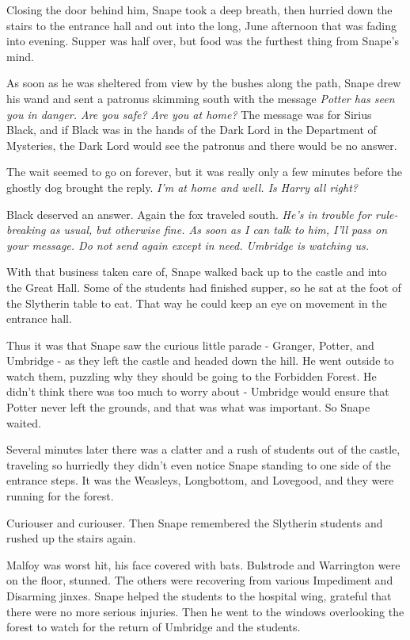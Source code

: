 \documentclass[a4paper,11pt]{article}
\begin{document}
Closing the door behind him, Snape took a deep breath, then hurried down the stairs to the entrance hall and out into the long, June afternoon that was fading into evening. Supper was half over, but food was the furthest thing from Snape's mind.

As soon as he was sheltered from view by the bushes along the path, Snape drew his wand and sent a patronus skimming south with the message \emph{Potter has seen you in danger. Are you safe? Are you at home?} The message was for Sirius Black, and if Black was in the hands of the Dark Lord in the Department of Mysteries, the Dark Lord would see the patronus and there would be no answer.

The wait seemed to go on forever, but it was really only a few minutes before the ghostly dog brought the reply. \emph{I'm at home and well. Is Harry all right?}

Black deserved an answer. Again the fox traveled south. \emph{He's in trouble for rule-breaking as usual, but otherwise fine. As soon as I can talk to him, I'll pass on your message. Do not send again except in need. Umbridge is watching us.}

With that business taken care of, Snape walked back up to the castle and into the Great Hall. Some of the students had finished supper, so he sat at the foot of the Slytherin table to eat. That way he could keep an eye on movement in the entrance hall.

Thus it was that Snape saw the curious little parade - Granger, Potter, and Umbridge - as they left the castle and headed down the hill. He went outside to watch them, puzzling why they should be going to the Forbidden Forest. He didn't think there was too much to worry about - Umbridge would ensure that Potter never left the grounds, and that was what was important. So Snape waited.

Several minutes later there was a clatter and a rush of students out of the castle, traveling so hurriedly they didn't even notice Snape standing to one side of the entrance steps. It was the Weasleys, Longbottom, and Lovegood, and they were running for the forest.

Curiouser and curiouser. Then Snape remembered the Slytherin students and rushed up the stairs again.

Malfoy was worst hit, his face covered with bats. Bulstrode and Warrington were on the floor, stunned. The others were recovering from various Impediment and Disarming jinxes. Snape helped the students to the hospital wing, grateful that there were no more serious injuries. Then he went to the windows overlooking the forest to watch for the return of Umbridge and the students.
\end{document}
